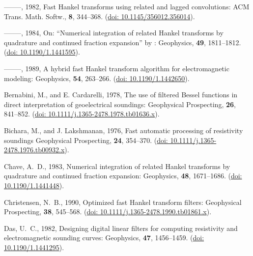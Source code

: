 \documentclass[a4paper, twoside, parskip, 10pt]{scrartcl}
\begin{document}
\begin{multicols}{2}
\begin{thebibliography}{}
--------, 1982, Fast {H}ankel transforms using related and lagged convolutions:
  ACM Trans. Math. Softw., {\bf 8}, 344--368.
\newblock (\href{https://doi.org/10.1145/356012.356014}{doi:
  10.1145/356012.356014}).

--------, 1984, {On: “Numerical integration of related Hankel transforms by
  quadrature and continued fraction expansion” by \cite{GEO.83.Chave}}:
  Geophysics, {\bf 49}, 1811--1812.
\newblock (\href{https://doi.org/10.1190/1.1441595}{doi: 10.1190/1.1441595}).

--------, 1989, A hybrid fast {H}ankel transform algorithm for electromagnetic
  modeling: Geophysics, {\bf 54}, 263--266.
\newblock (\href{https://doi.org/10.1190/1.1442650}{doi: 10.1190/1.1442650}).

Bernabini, M., and E. Cardarelli,  1978, The use of filtered {B}essel functions
  in direct interpretation of geoelectrical soundings: Geophysical Prospecting,
  {\bf 26}, 841--852.
\newblock (\href{https://doi.org/10.1111/j.1365-2478.1978.tb01636.x}{doi:
  10.1111/j.1365-2478.1978.tb01636.x}).

Bichara, M., and J. Lakshmanan,  1976, Fast automatic processing of resistivity
  soundings Geophysical Prospecting, {\bf 24}, 354--370.
\newblock (\href{https://doi.org/10.1111/j.1365-2478.1976.tb00932.x}{doi:
  10.1111/j.1365-2478.1976.tb00932.x}).

Chave, A.~D.,  1983, Numerical integration of related {H}ankel transforms by
  quadrature and continued fraction expansion: Geophysics, {\bf 48},
  1671--1686.
\newblock (\href{https://doi.org/10.1190/1.1441448}{doi: 10.1190/1.1441448}).

Christensen, N.~B.,  1990, Optimized fast {H}ankel transform filters:
  Geophysical Prospecting, {\bf 38}, 545--568.
\newblock (\href{https://doi.org/10.1111/j.1365-2478.1990.tb01861.x}{doi:
  10.1111/j.1365-2478.1990.tb01861.x}).

Das, U.~C.,  1982, Designing digital linear filters for computing resistivity
  and electromagnetic sounding curves: Geophysics, {\bf 47}, 1456--1459.
\newblock (\href{https://doi.org/10.1190/1.1441295}{doi: 10.1190/1.1441295}).


\end{thebibliography}
\end{multicols}
\end{document}
